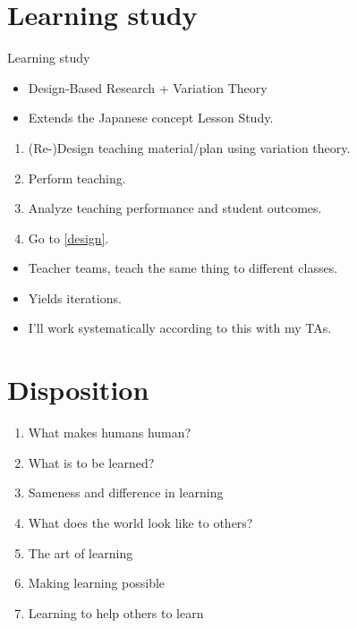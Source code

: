 \section{Learning study}

\begin{frame}
  \begin{block}{Learning study~\cite{LearningStudy}}
    \begin{itemize}
      \item Design-Based Research + Variation Theory
      \item Extends the Japanese concept Lesson Study.
    \end{itemize}
    \pause
    \begin{enumerate}
      \item \label{design} (Re-)Design teaching material/plan using variation 
        theory.
      \item Perform teaching.
      \item Analyze teaching performance and student outcomes.
      \item Go to \ref{design}.
    \end{enumerate}
  \end{block}

  \pause

  \begin{remark}
    \begin{itemize}
      \item Teacher teams, teach the same thing to different classes.
      \item Yields iterations.
    \end{itemize}
  \end{remark}
\end{frame}

\begin{frame}
  \begin{example}
    \begin{itemize}
      \item I'll work systematically according to this with my TAs.
    \end{itemize}
  \end{example}
\end{frame}

\section{Disposition}

\begin{frame}
  \begin{enumerate}
    \item What makes humans human?
    \item What is to be learned?
    \item Sameness and difference in learning
    \item What does the world look like to others?
    \item The art of learning
    \item Making learning possible
    \item Learning to help others to learn
  \end{enumerate}
\end{frame}

